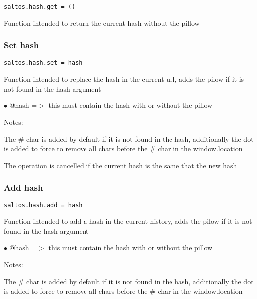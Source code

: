\documentclass[a4paper]{article}
\begin{document}
\begin{lstlisting}
saltos.hash.get = ()
\end{lstlisting}

Function intended to return the current hash without the pillow

\hypertarget{toc810}{}
\subsubsection{Set hash}

\begin{lstlisting}
saltos.hash.set = hash
\end{lstlisting}

Function intended to replace the hash in the current url, adds the pilow if it is not found
in the hash argument

\begin{compactitem}
\item[\color{myblue}$\bullet$] @hash =$>$ this must contain the hash with or without the pillow
\end{compactitem}

Notes:

The \# char is added by default if it is not found in the hash, additionally the dot is
added to force to remove all chars before the \# char in the window.location

The operation is cancelled if the current hash is the same that the new hash

\hypertarget{toc811}{}
\subsubsection{Add hash}

\begin{lstlisting}
saltos.hash.add = hash
\end{lstlisting}

Function intended to add a hash in the current history, adds the pilow if it is not found
in the hash argument

\begin{compactitem}
\item[\color{myblue}$\bullet$] @hash =$>$ this must contain the hash with or without the pillow
\end{compactitem}

Notes:

The \# char is added by default if it is not found in the hash, additionally the dot is
added to force to remove all chars before the \# char in the window.location
\end{document}
